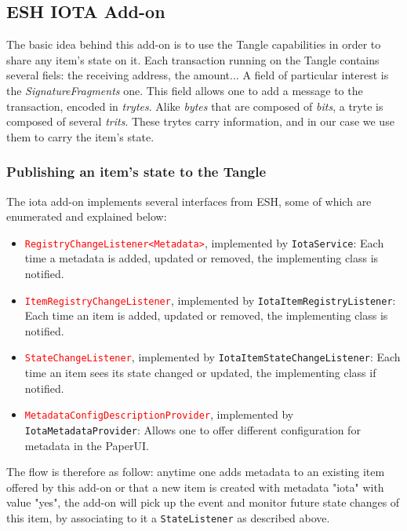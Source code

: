 \documentclass[a4paper,10pt]{article}
\begin{document}
\subsection{ESH IOTA Add-on}

The basic idea behind this add-on is to use the Tangle capabilities in order to share any item's state on it. Each transaction running on the Tangle contains several fiels: the receiving address, the amount... A field of particular interest is the \textit{SignatureFragments} one. This field allows one to add a message to the transaction, encoded in \textit{trytes}. Alike \textit{bytes} that are composed of \textit{bits}, a tryte is composed of several \textit{trits}. These trytes carry information, and in our case we use them to carry the item's state.

\subsubsection{Publishing an item's state to the Tangle}

The iota add-on implements several interfaces from ESH, some of which are enumerated and explained below:

\begin{itemize}
	\item \texttt{\textcolor{red}{RegistryChangeListener<Metadata>}}, implemented by \texttt{\textcolor{OliveGreen}{IotaService}}: Each time a metadata is added, updated or removed, the implementing class is notified.
	\item \texttt{\textcolor{red}{ItemRegistryChangeListener}}, implemented by \texttt{\textcolor{OliveGreen}{IotaItemRegistryListener}}: Each time an item is added, updated or removed, the implementing class is notified.
	\item \texttt{\textcolor{red}{StateChangeListener}}, implemented by \texttt{\textcolor{OliveGreen}{IotaItemStateChangeListener}}: Each time an item sees its state changed or updated, the implementing class if notified. 
	\item \texttt{\textcolor{red}{MetadataConfigDescriptionProvider}}, implemented by \texttt{\textcolor{OliveGreen}{IotaMetadataProvider}}: Allows one to offer different configuration for metadata in the PaperUI.
\end{itemize}

\noindent The flow is therefore as follow: anytime one adds metadata to an existing item offered by this add-on or that a new item is created with metadata "iota" with value "yes", the add-on will pick up the event and monitor future state changes of this item, by associating to it a \texttt{StateListener} as described above. \\
\end{document}
